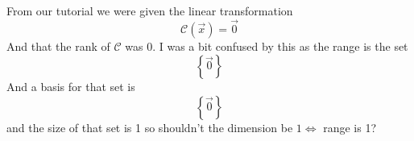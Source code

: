 \documentclass[11pt]{article}
\begin{document}
    From our tutorial we were given the linear transformation 
    \begin{equation*}
        \mathcal{C}\left(\vec{x}\right) = \vec{0}
    \end{equation*}
    And that the rank of $\mathcal{C}$ was $0$. I was a bit confused by this as the range is the set
    \[
    \left\{ \vec{0} \right\}
    \]
    And a basis for that set is 
    \[
    \left\{ \vec{0} \right\}
    \]
    and the size of that set is 1 so shouldn't the dimension be $1 \Leftrightarrow$ range is 1?
\end{document}

